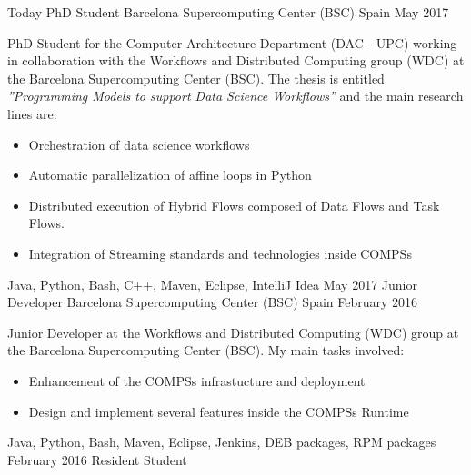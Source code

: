 %
%
%


\begin{experiences}
    \experience
        {Today}
        {PhD Student}
        {Barcelona Supercomputing Center (BSC)}
        {Spain}
        {May 2017}
        {PhD Student for the Computer Architecture Department (DAC - UPC) working in collaboration with the Workflows and Distributed Computing group (WDC) at the Barcelona Supercomputing Center (BSC). The thesis is entitled \textit{''Programming Models to support Data Science Workflows''} and the main research lines are:
        \begin{itemize}
            \item Orchestration of data science workflows
            \item Automatic parallelization of affine loops in Python
            \item Distributed execution of Hybrid Flows composed of Data Flows and Task Flows.
            \item Integration of Streaming standards and technologies inside COMPSs
        \end{itemize}
        }
        {Java, Python, Bash, C++, Maven, Eclipse, IntelliJ Idea}
    \emptySeparator
    \experience
        {May 2017}
        {Junior Developer}
        {Barcelona Supercomputing Center (BSC)}
        {Spain}
        {February 2016}
        {Junior Developer at the Workflows and Distributed Computing (WDC) group at the Barcelona Supercomputing Center (BSC). My main tasks involved:
        \begin{itemize}
            \item Enhancement of the COMPSs infrastucture and deployment
            \item Design and implement several features inside the COMPSs Runtime
        \end{itemize}
        }
        {Java, Python, Bash, Maven, Eclipse, Jenkins, DEB packages, RPM packages}
    \emptySeparator
    \experience
        {February 2016}
        {Resident Student}

\end{experiences}
